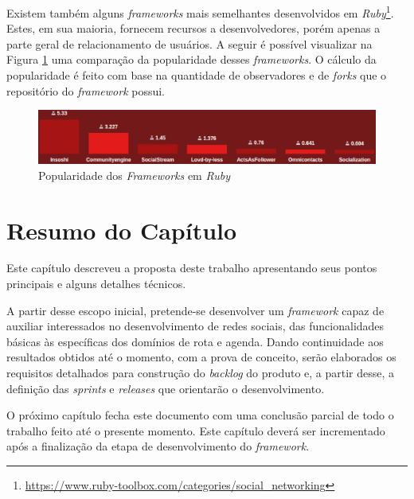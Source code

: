 Existem também alguns \textit{frameworks} mais semelhantes desenvolvidos em \textit{Ruby}\footnote{\url{https://www.ruby-toolbox.com/categories/social_networking}}. Estes, em sua maioria, fornecem recursos a desenvolvedores, porém apenas a parte geral de relacionamento de usuários. A seguir é possível visualizar na Figura \ref{ruby_social_network} uma comparação da popularidade desses \textit{frameworks}. O cálculo da popularidade é feito com base na quantidade de observadores e de \textit{forks} que o repositório do \textit{framework} possui.

\begin{figure}[!h]
	\centering
	\includegraphics[scale=0.45]{figuras/capitulo5/ruby_social_network.eps}
	\caption{Popularidade dos \textit{Frameworks} em \textit{Ruby}}
	\label{ruby_social_network}
\end{figure}

\section{Resumo do Capítulo}

Este capítulo descreveu a proposta deste trabalho apresentando seus pontos principais e alguns detalhes técnicos.

A partir desse escopo inicial, pretende-se desenvolver um \textit{framework}  capaz de auxiliar interessados no desenvolvimento de redes sociais, das funcionalidades básicas às específicas dos domínios de rota e agenda. Dando continuidade aos resultados obtidos até o momento, com a prova de conceito, serão elaborados os requisitos detalhados para construção do \textit{backlog} do produto e, a partir desse, a definição das \textit{sprints} e \textit{releases} que orientarão o desenvolvimento.

O próximo capítulo fecha este documento com uma conclusão parcial de todo o trabalho feito até o presente momento. Este capítulo deverá ser incrementado após a finalização da etapa de desenvolvimento do \textit{framework}.
